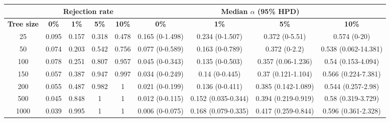 \begin{tabular}{ccccccccc}
  \hline
  & \multicolumn{4}{c}{\textbf{Rejection rate}} & \multicolumn{4}{c}{\textbf{Median $\alpha$ (95\% HPD)}} \\
  \hline
  \textbf{Tree size}    &    \textbf{0\%} & \textbf{1\%}  & \textbf{5\%}  &  \textbf{10\%}   &    \textbf{0\%} & \textbf{1\%}  & \textbf{5\%}  &  \textbf{10\%} \\
  \hline
  25   &    0.095     &    0.157  & 0.318     &    0.478     &    0.165 (0-1.498)     &    0.234 (0-1.507)     &    0.372 (0-5.51) &    0.574 (0-20)   \\
  50   &    0.074     &    0.203      &    0.542     &    0.756     &    0.077 (0-0.589)     &    0.163 (0-0.789)     &    0.372 (0-2.2)  &    0.538 (0.062-14.381)     \\
  100  &    0.078     &    0.251     &     0.807     &    0.957     &    0.045 (0-0.343)     &    0.135 (0-0.503)     &    0.357 (0.06-1.236)  &    0.54 (0.153-4.094)  \\
  150  &    0.057     &    0.387     &     0.947     &    0.997     &    0.034 (0-0.249)     &    0.14 (0-0.445) &    0.37 (0.121-1.104)  &    0.566 (0.224-7.381) \\
  200  &    0.055     &    0.487      &    0.982     &    1    &    0.021 (0-0.199)     &    0.136 (0-0.411)     &    0.385 (0.142-1.089) &    0.544 (0.257-2.98)  \\
  500  &    0.045     &    0.848     &     1    &    1    &    0.012 (0-0.115)     &    0.152 (0.035-0.344) &    0.394 (0.219-0.919) &    0.58 (0.319-3.729)  \\
  1000 &    0.039     &    0.995     &     1    &    1    &    0.006 (0-0.075)     &    0.168 (0.079-0.335) &    0.417 (0.259-0.844) &    0.596 (0.361-2.328) \\
  \hline
\end{tabular}